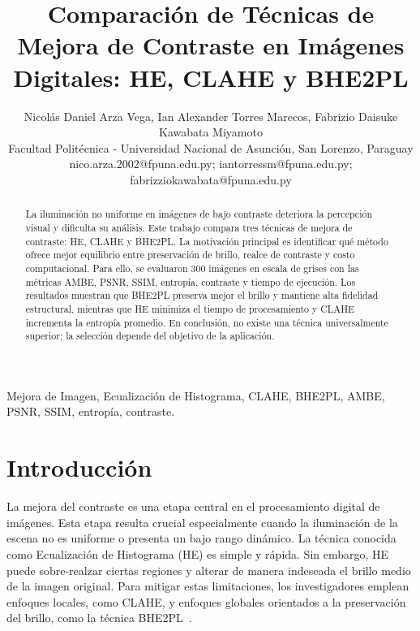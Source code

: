 \documentclass[journal,10pt,twocolumn]{IEEEtran}
\begin{document}
\title{Comparación de Técnicas de Mejora de Contraste en Imágenes Digitales: HE, CLAHE y BHE2PL}

\author{
	Nicolás Daniel Arza Vega, Ian Alexander Torres Marecos, Fabrizio Daisuke Kawabata Miyamoto\\
	Facultad Politécnica - Universidad Nacional de Asunción, San Lorenzo, Paraguay\\
	nico.arza.2002@fpuna.edu.py; iantorressm@fpuna.edu.py; fabrizziokawabata@fpuna.edu.py
}

\maketitle

\begin{abstract}
	La iluminación no uniforme en imágenes de bajo contraste deteriora la percepción visual y dificulta su análisis. Este trabajo compara tres técnicas de mejora de contraste: HE, CLAHE y BHE2PL. La motivación principal es identificar qué método ofrece mejor equilibrio entre preservación de brillo, realce de contraste y costo computacional. Para ello, se evaluaron 300 imágenes en escala de grises con las métricas AMBE, PSNR, SSIM, entropía, contraste y tiempo de ejecución. Los resultados muestran que BHE2PL preserva mejor el brillo y mantiene alta fidelidad estructural, mientras que HE minimiza el tiempo de procesamiento y CLAHE incrementa la entropía promedio. En conclusión, no existe una técnica universalmente superior; la selección depende del objetivo de la aplicación.
\end{abstract}

\begin{IEEEkeywords} 
	Mejora de Imagen, Ecualización de Histograma, CLAHE, BHE2PL, AMBE, PSNR, SSIM, entropía, contraste.
\end{IEEEkeywords}

\section{Introducción}
La mejora del contraste es una etapa central en el procesamiento digital de imágenes. Esta etapa resulta crucial especialmente cuando la iluminación de la escena no es uniforme o presenta un bajo rango dinámico. La técnica conocida como Ecualización de Histograma (HE) es simple y rápida. Sin embargo, HE puede sobre-realzar ciertas regiones y alterar de manera indeseada el brillo medio de la imagen original. Para mitigar estas limitaciones, los investigadores emplean enfoques locales, como CLAHE, y enfoques globales orientados a la preservación del brillo, como la técnica BHE2PL~\cite{aquino2017bi}.
\end{document}
